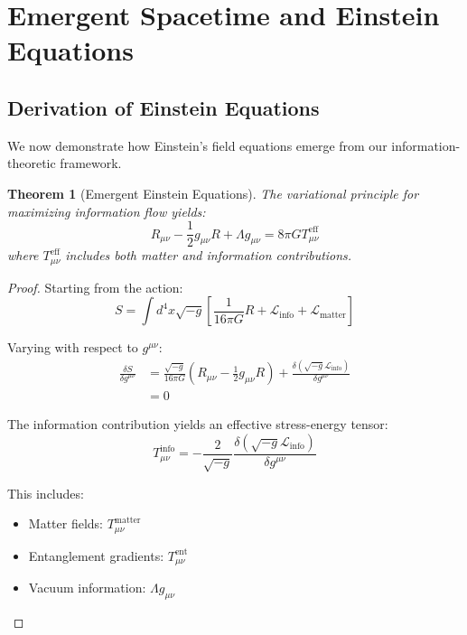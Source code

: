 \documentclass[12pt]{article}
\newtheorem{theorem}{Theorem}[section]
\begin{document}
\section{Emergent Spacetime and Einstein Equations}

\subsection{Derivation of Einstein Equations}

We now demonstrate how Einstein's field equations emerge from our information-theoretic framework.

\begin{theorem}[Emergent Einstein Equations]
The variational principle for maximizing information flow yields:
\begin{equation}
R_{\mu\nu} - \frac{1}{2}g_{\mu\nu}R + \Lambda g_{\mu\nu} = 8\pi G T_{\mu\nu}^{\text{eff}}
\end{equation}
where $T_{\mu\nu}^{\text{eff}}$ includes both matter and information contributions.
\end{theorem}

\begin{proof}
Starting from the action:
\begin{equation}
S = \int d^4x \sqrt{-g} \left[\frac{1}{16\pi G}R + \mathcal{L}_{\text{info}} + \mathcal{L}_{\text{matter}}\right]
\end{equation}

Varying with respect to $g^{\mu\nu}$:
\begin{align}
\frac{\delta S}{\delta g^{\mu\nu}} &= \frac{\sqrt{-g}}{16\pi G}\left(R_{\mu\nu} - \frac{1}{2}g_{\mu\nu}R\right) + \frac{\delta(\sqrt{-g}\mathcal{L}_{\text{info}})}{\delta g^{\mu\nu}} \\
&= 0
\end{align}

The information contribution yields an effective stress-energy tensor:
\begin{equation}
T_{\mu\nu}^{\text{info}} = -\frac{2}{\sqrt{-g}}\frac{\delta(\sqrt{-g}\mathcal{L}_{\text{info}})}{\delta g^{\mu\nu}}
\end{equation}

This includes:
\begin{itemize}
\item Matter fields: $T_{\mu\nu}^{\text{matter}}$
\item Entanglement gradients: $T_{\mu\nu}^{\text{ent}}$
\item Vacuum information: $\Lambda g_{\mu\nu}$
\end{itemize}
\end{proof}
\end{document}
